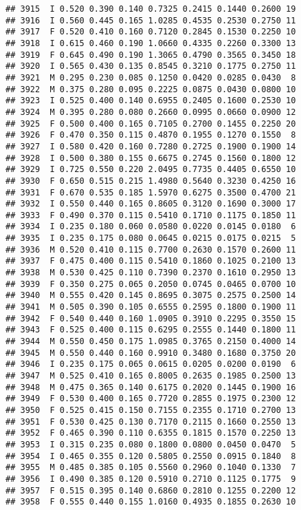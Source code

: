 \documentclass[
]{article}
\begin{document}
\begin{verbatim}
## 3915  I 0.520 0.390 0.140 0.7325 0.2415 0.1440 0.2600 19
## 3916  I 0.560 0.445 0.165 1.0285 0.4535 0.2530 0.2750 11
## 3917  F 0.520 0.410 0.160 0.7120 0.2845 0.1530 0.2250 10
## 3918  I 0.615 0.460 0.190 1.0660 0.4335 0.2260 0.3300 13
## 3919  F 0.645 0.490 0.190 1.3065 0.4790 0.3565 0.3450 18
## 3920  I 0.565 0.430 0.135 0.8545 0.3210 0.1775 0.2750 11
## 3921  M 0.295 0.230 0.085 0.1250 0.0420 0.0285 0.0430  8
## 3922  M 0.375 0.280 0.095 0.2225 0.0875 0.0430 0.0800 10
## 3923  I 0.525 0.400 0.140 0.6955 0.2405 0.1600 0.2530 10
## 3924  M 0.395 0.280 0.080 0.2660 0.0995 0.0660 0.0900 12
## 3925  F 0.500 0.400 0.165 0.7105 0.2700 0.1455 0.2250 20
## 3926  F 0.470 0.350 0.115 0.4870 0.1955 0.1270 0.1550  8
## 3927  I 0.580 0.420 0.160 0.7280 0.2725 0.1900 0.1900 14
## 3928  I 0.500 0.380 0.155 0.6675 0.2745 0.1560 0.1800 12
## 3929  I 0.725 0.550 0.220 2.0495 0.7735 0.4405 0.6550 10
## 3930  F 0.650 0.515 0.215 1.4980 0.5640 0.3230 0.4250 16
## 3931  F 0.670 0.535 0.185 1.5970 0.6275 0.3500 0.4700 21
## 3932  I 0.550 0.440 0.165 0.8605 0.3120 0.1690 0.3000 17
## 3933  F 0.490 0.370 0.115 0.5410 0.1710 0.1175 0.1850 11
## 3934  I 0.235 0.180 0.060 0.0580 0.0220 0.0145 0.0180  6
## 3935  I 0.235 0.175 0.080 0.0645 0.0215 0.0175 0.0215  5
## 3936  M 0.520 0.410 0.115 0.7700 0.2630 0.1570 0.2600 11
## 3937  F 0.475 0.400 0.115 0.5410 0.1860 0.1025 0.2100 13
## 3938  M 0.530 0.425 0.110 0.7390 0.2370 0.1610 0.2950 13
## 3939  F 0.350 0.275 0.065 0.2050 0.0745 0.0465 0.0700 10
## 3940  M 0.555 0.420 0.145 0.8695 0.3075 0.2575 0.2500 14
## 3941  M 0.505 0.390 0.105 0.6555 0.2595 0.1800 0.1900 11
## 3942  F 0.540 0.440 0.160 1.0905 0.3910 0.2295 0.3550 15
## 3943  F 0.525 0.400 0.115 0.6295 0.2555 0.1440 0.1800 11
## 3944  M 0.550 0.450 0.175 1.0985 0.3765 0.2150 0.4000 14
## 3945  M 0.550 0.440 0.160 0.9910 0.3480 0.1680 0.3750 20
## 3946  I 0.235 0.175 0.065 0.0615 0.0205 0.0200 0.0190  6
## 3947  M 0.525 0.410 0.165 0.8005 0.2635 0.1985 0.2500 13
## 3948  M 0.475 0.365 0.140 0.6175 0.2020 0.1445 0.1900 16
## 3949  F 0.530 0.400 0.165 0.7720 0.2855 0.1975 0.2300 12
## 3950  F 0.525 0.415 0.150 0.7155 0.2355 0.1710 0.2700 13
## 3951  F 0.530 0.425 0.130 0.7170 0.2115 0.1660 0.2550 13
## 3952  F 0.465 0.390 0.110 0.6355 0.1815 0.1570 0.2250 13
## 3953  I 0.315 0.235 0.080 0.1800 0.0800 0.0450 0.0470  5
## 3954  I 0.465 0.355 0.120 0.5805 0.2550 0.0915 0.1840  8
## 3955  M 0.485 0.385 0.105 0.5560 0.2960 0.1040 0.1330  7
## 3956  I 0.490 0.385 0.120 0.5910 0.2710 0.1125 0.1775  9
## 3957  F 0.515 0.395 0.140 0.6860 0.2810 0.1255 0.2200 12
## 3958  F 0.555 0.440 0.155 1.0160 0.4935 0.1855 0.2630 10

\end{verbatim}
\end{document}
